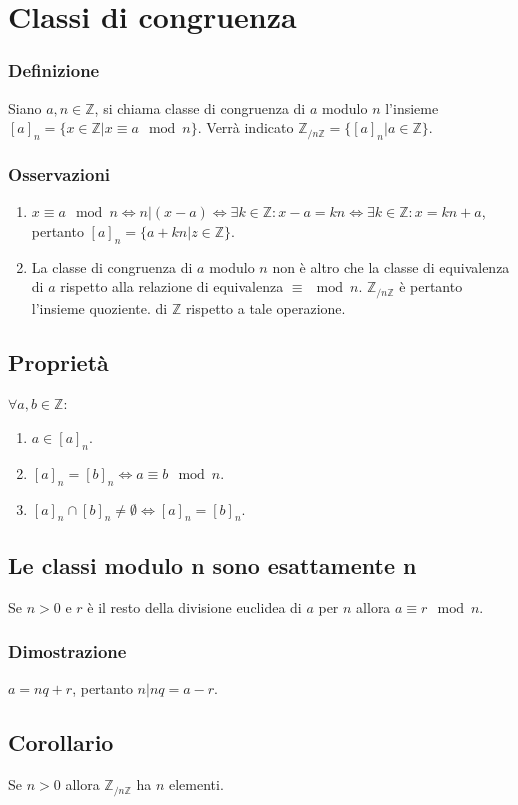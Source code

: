 \section{Classi di congruenza}
\subsubsection{Definizione}
Siano $a, n\in\mathbb{Z}$, si chiama classe di congruenza di $a$ modulo $n$ l'insieme $[a]_n=\{x\in\mathbb{Z}|x\equiv a\mod n\}$. Verr\`a indicato $\mathbb{Z}_{/ n
\mathbb{Z}}=\{[a]_n|a\in\mathbb{Z}\}$.
\subsubsection{Osservazioni}
\begin{enumerate}
\item $x\equiv a\mod n\Leftrightarrow n|(x-a)\Leftrightarrow \exists k\in\mathbb{Z}:x-a=kn\Leftrightarrow\exists k\in\mathbb{Z}:x=kn+a$, pertanto $[a]_n=\{a+kn|z\in\mathbb{Z}
\}$.
\item La classe di congruenza di $a$ modulo $n$ non \`e altro che la classe di equivalenza di $a$ rispetto alla relazione di equivalenza $\equiv\mod n$. $\mathbb{Z}_{/ 
n\mathbb{Z}}$ \`e pertanto l'insieme quoziente. di $\mathbb{Z}$ rispetto a tale operazione. 
\end{enumerate}
\subsection{Propriet\`a}
$\forall a,b\in\mathbb{Z}$:
\begin{enumerate}
\item $a\in [a]_n$.
\item $[a]_n=[b]_n\Leftrightarrow a\equiv b\mod n$.
\item $[a]_n\cap[b]_n\neq\emptyset\Leftrightarrow [a]_n=[b]_n$.
\end{enumerate}
\subsection{Le classi modulo n sono esattamente n}
Se $n>0$ e $r$ \`e il resto della divisione euclidea di $a$ per $n$ allora $a\equiv r\mod n$.
\subsubsection{Dimostrazione}
$a=nq+r$, pertanto $n|nq=a-r$.
\subsection{Corollario}
Se $n>0$ allora $\mathbb{Z}_{/ n\mathbb{Z}}$ ha $n$ elementi.
